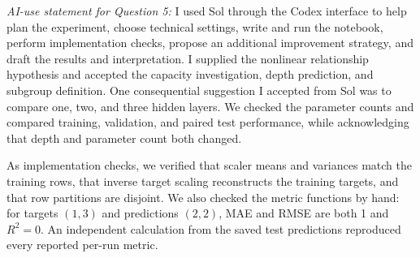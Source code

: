 \documentclass[12pt]{article}
\begin{document}
\begin{enumerate}
\begin{enumerate}[label=\textbf{\Alph*.}, leftmargin=*]
       \noindent\textit{AI-use statement for Question 5:}
       I used Sol through the Codex interface to help plan the experiment,
       choose technical settings, write and run the notebook, perform
       implementation checks, propose an additional improvement strategy,
       and draft the results and interpretation. I supplied the nonlinear
       relationship hypothesis and accepted the capacity investigation,
       depth prediction, and subgroup definition.
       One consequential suggestion I accepted from Sol was to compare
       one, two, and three hidden layers. We checked the parameter counts
       and compared training, validation, and paired test performance,
       while acknowledging that depth and parameter count both changed.

       As implementation checks, we verified that scaler means and
       variances match the training rows, that inverse target scaling
       reconstructs the training targets, and that row partitions are
       disjoint. We also checked the metric functions by hand: for targets
       $(1,3)$ and predictions $(2,2)$, MAE and RMSE are both 1 and
       $R^2=0$. An independent calculation from the saved test predictions
       reproduced every reported per-run metric.
   \end{enumerate}

\end{enumerate}
\end{document}
